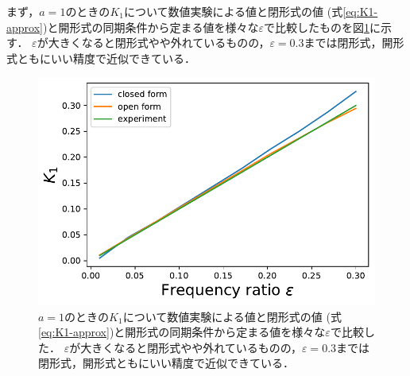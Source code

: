 \documentclass[../main]{subfiles}
\begin{document}
まず，$a=1$のときの$K_1$について数値実験による値と閉形式の値 (式\eqref{eq:K1-approx})と開形式の同期条件から定まる値を様々な$\varepsilon$で比較したものを図\ref{fig:k1-compare}に示す．
$\varepsilon$が大きくなると閉形式やや外れているものの，$\varepsilon=0.3$までは閉形式，開形式ともにいい精度で近似できている．
\begin{figure}[tbp]
\centering
\includegraphics[width=135mm]{./images/k1-compare.pdf}
\centering
\caption{$a=1$のときの$K_1$について数値実験による値と閉形式の値 (式\eqref{eq:K1-approx})と開形式の同期条件から定まる値を様々な$\varepsilon$で比較した．
$\varepsilon$が大きくなると閉形式やや外れているものの，$\varepsilon=0.3$までは閉形式，開形式ともにいい精度で近似できている．}
\label{fig:k1-compare}
\end{figure}
\end{document}
